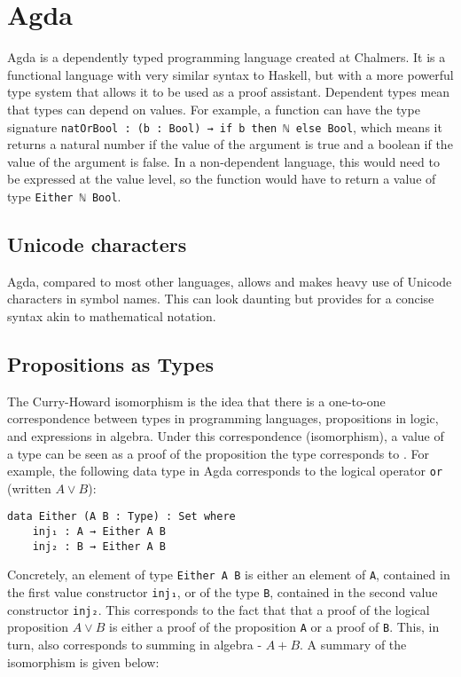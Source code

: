 \section{Agda}
Agda is a dependently typed programming language \cite{agdaWebsite} created at Chalmers.
It is a functional language with very similar syntax to Haskell, but with a more powerful type system that allows it to be used as a proof assistant. 
Dependent types mean that types can depend on values. For example, a function can have the type signature \texttt{natOrBool : (b : Bool) → if b then ℕ else Bool}, which means it returns a natural number if the value of the argument is true and a boolean if the value of the argument is false. In a non-dependent language, this would need to be expressed at the value level, so the function would have to return a value of type \texttt{Either ℕ Bool}.

\subsection{Unicode characters}
Agda, compared to most other languages, allows and makes heavy use of Unicode characters in symbol names. This can look daunting but provides for a concise syntax akin to mathematical notation. 

\subsection{Propositions as Types}
The Curry-Howard isomorphism \cite{propositionastypes} is the idea that there is a one-to-one correspondence between types in programming languages, propositions in logic, and expressions in algebra. Under this correspondence (isomorphism), a value of a type can be seen as a proof of the proposition the type corresponds to \cite{DependentTypesAtWork}. For example, the following data type in Agda corresponds to the logical operator \texttt{or} (written $A \vee B$):

\begin{verbatim}
data Either (A B : Type) : Set where
    inj₁ : A → Either A B
    inj₂ : B → Either A B
\end{verbatim}

Concretely, an element of type \texttt{Either A B} is either an element of \texttt{A}, contained in the first value constructor \texttt{inj₁}, or of the type \texttt{B}, contained in the second value constructor \texttt{inj₂}. This corresponds to the fact that that a proof of the logical proposition $A \vee B$ is either a proof of the proposition \texttt{A} or a proof of \texttt{B}. This, in turn, also corresponds to summing in algebra - $A + B$. A summary of the isomorphism is given below:

